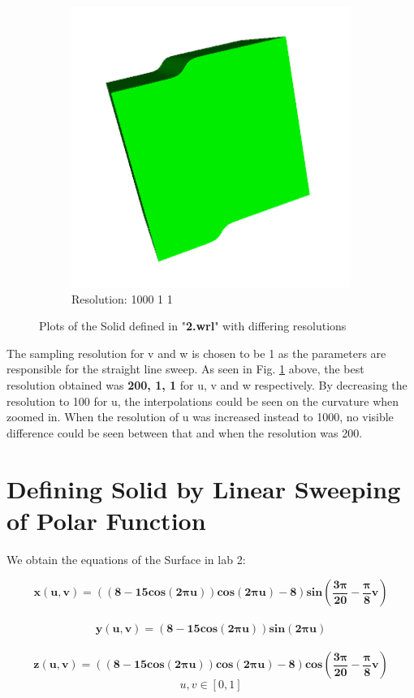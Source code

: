 \documentclass[acmlarge,nonacm=true]{acmart}
\begin{document}
\begin{figure}[H]
\begin{subfigure}{.33\textwidth}
		\includegraphics[width=.8\linewidth]{fig/2_1000_1_1}
		\caption{Resolution: 1000 1 1}
	  \end{subfigure}
	\caption{Plots of the Solid defined in "\textbf{2.wrl}" with differing resolutions}
	\label{fig:2}
\end{figure}

The sampling resolution for v and w is chosen to be 1 as the parameters are responsible for the straight line sweep.
As seen in Fig. \ref{fig:2} above, the best resolution obtained was \textbf{200, 1, 1} for u, v and w respectively.
By decreasing the resolution to 100 for u, the interpolations could be seen on the curvature when zoomed in. When the resolution of u was 
increased instead to 1000, no visible difference could be seen between that and when the resolution was 200.
\pagebreak
\section{Defining Solid by Linear Sweeping of Polar Function}
We obtain the equations of the Surface in lab 2:

\begin{displaymath}
	\mathbf{x(u,v) =  ((8 - 15cos(2\pi u))cos(2\pi u)-8)sin(\frac{3\pi}{20} - \frac{\pi}{8}v)}
\end{displaymath}\\
\begin{displaymath}
	\mathbf{y(u,v) =  (8 - 15cos(2\pi u))sin(2\pi u)}
\end{displaymath}\\
\begin{displaymath}
	\mathbf{z(u,v) =  ((8 - 15cos(2\pi u))cos(2\pi u)-8)cos(\frac{3\pi}{20} - \frac{\pi}{8}v)}
\end{displaymath}
\begin{displaymath}
	u,v \in [0, 1]
\end{displaymath}
\end{document}
